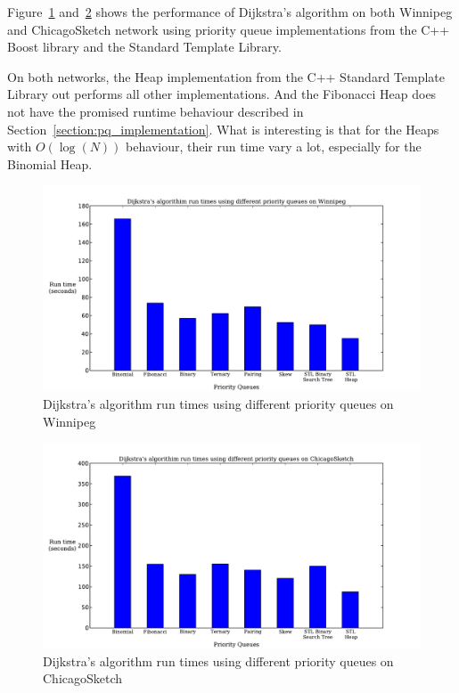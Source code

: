 Figure~\ref{fig:pq_runtime2} and~\ref{fig:pq_runtime} shows the performance of Dijkstra's algorithm on both Winnipeg and ChicagoSketch network using priority queue implementations from the C++ Boost library and the Standard Template Library.

On both networks, the Heap implementation from the C++ Standard Template Library out performs all other implementations.
And the Fibonacci Heap does not have the promised runtime behaviour described in Section~\ref{section:pq_implementation}.
What is interesting is that for the Heaps with $O(\log(N))$ behaviour, their run time vary a lot, especially for the Binomial Heap.

\begin{figure}[H]
    \centering
    \includegraphics[width=\textwidth]{img/pq_runtime2}
    \caption{Dijkstra's algorithm run times using different priority queues on Winnipeg}
    \label{fig:pq_runtime2}
\end{figure}

\begin{figure}[H]
    \centering
    \includegraphics[width=\textwidth]{img/pq_runtime}
    \caption{Dijkstra's algorithm run times using different priority queues on ChicagoSketch}
    \label{fig:pq_runtime}
\end{figure}

